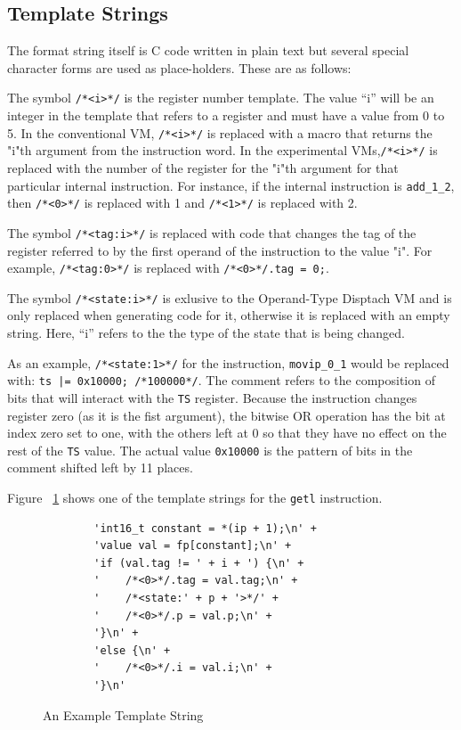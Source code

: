 \documentclass[english,a4paper,12pt]{report}
\begin{document}
\subsection{Template Strings}

The format string itself is C code written in plain text but several
special character forms are used as place-holders. These are as
follows:

The symbol \verb|/*<i>*/| is the register number template. The value
``i'' will be an integer in the template that refers to a register and
must have a value from 0 to 5. In the conventional VM, \verb|/*<i>*/|
is replaced with a macro that returns the "i"th argument from the
instruction word. In the experimental VMs,\verb|/*<i>*/| is replaced
with the number of the register for the "i"th argument for that
particular internal instruction.  For instance, if the internal
instruction is \verb|add_1_2|, then \verb|/*<0>*/| is replaced with 1
and \verb|/*<1>*/| is replaced with 2.

The symbol \verb|/*<tag:i>*/| is replaced with code that changes the
tag of the register referred to by the first operand of the
instruction to the value "i". For example, \verb|/*<tag:0>*/| is
replaced with \verb|/*<0>*/.tag = 0;|.

The symbol \verb|/*<state:i>*/| is exlusive to the Operand-Type
Disptach VM and is only replaced when generating code for it,
otherwise it is replaced with an empty string. Here, ``i'' refers to
the the type of the state that is being changed.

As an example, \verb|/*<state:1>*/| for the instruction,
\verb|movip_0_1| would be replaced with:
\verb+ts |= 0x10000; /*100000*/+. The comment refers to the
composition of bits that will interact with the \verb|TS|
register. Because the instruction changes register zero (as it is the
fist argument), the bitwise OR operation has the bit at index zero set
to one, with the others left at 0 so that they have no effect on the
rest of the \verb|TS| value. The actual value \verb|0x10000| is the
pattern of bits in the comment shifted left by 11 places.

Figure ~\ref{fig:template-string} shows one of the template strings
for the \verb|getl| instruction.

\begin{figure}
	\begin{lstlisting}
		'int16_t constant = *(ip + 1);\n' +
		'value val = fp[constant];\n' +
		'if (val.tag != ' + i + ') {\n' +
		'    /*<0>*/.tag = val.tag;\n' +
		'    /*<state:' + p + '>*/' +
		'    /*<0>*/.p = val.p;\n' +
		'}\n' +
		'else {\n' +
		'    /*<0>*/.i = val.i;\n' +
		'}\n'
	\end{lstlisting}
	\caption{An Example Template String}
	\label{fig:template-string}
\end{figure}
\end{document}
